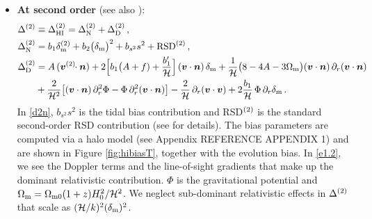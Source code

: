 {\begin{itemize}
\item
{\bfseries At second order}
\cite{Maartens:2019yhx} (see also \cite{Umeh:2015gza,DiDio:2015bua,Umeh:2016thy,Clarkson:2018dwn,DiDio:2018zmk}):
\begin{align}
\Delta^{{(2)}} &\equiv  \Delta^{(2)}_{{\mathrm{HI}}} = \Delta^{{(2)}}_{\mathrm{N}} + \Delta^{{(2)}}_{\mathrm{D}} \,,\\
\Delta^{{(2)}}_{\mathrm{N}}&= b_1\delta_{\mathrm{m}}^{{(2)}}+b_2 \big(\delta_{\mathrm{m}}\big)^2+ b_{s^2}s^2 + {\mathrm{RSD}}^{{(2)}}\,,
\label{d2n} \\
\Delta^{{(2)}}_{\mathrm{D}} &= A\, (\bm{v}^{(2)}\!\!\cdot\bm{n})+2\Big[ b_{1}\big(A+f) + \frac{b_1'}{\mathcal{H}}\Big]\,(\bm{v}\cdot\bm{n})\,\delta_{\mathrm{m}} +\frac{1}{\mathcal{H}}\big( 8-4A-3\Omega_{\mathrm{m}}   \big)(\bm{v}\cdot\bm{n})\,\partial_r(\bm{v}\cdot\bm{n})
\nonumber\\ \label{e1.2}
& +\frac{2}{\mathcal{H}^2}\big[(\bm{v}\cdot\bm{n}) \,\partial_r^2\Phi-\Phi\, \partial_r^2 (\bm{v}\cdot\bm{n}) \big]
 -\frac{2}{\mathcal{H}}\,\partial_r (\bm{v}\cdot\bm{v})+2 \frac{{b_{1}}}{\mathcal{H}}\,\Phi\, \partial_r\delta_{\mathrm{m}} \,.
\end{align}
In \eqref{d2n}, $b_{s^2}s^2$ is the tidal bias contribution and RSD$^{{(2)}}$ is the standard second-order RSD contribution (see \cite{Maartens:2019yhx} for details). The bias parameters are computed via a halo model (see  Appendix REFERENCE APPENDIX 1) and are shown in Figure \ref{fig:hibiasT}, together with the evolution bias.
In \eqref{e1.2}, we see the Doppler terms and the line-of-sight gradients that make up the dominant relativistic contribution.
$\Phi$ is the gravitational potential and $\Omega_{\mathrm{m}} =\Omega_{{\mathrm{m}}0}(1+z)H_0^2/\mathcal{H}^2$. We  neglect sub-dominant relativistic effects in $\Delta^{{(2)}}$ that scale as  $(\mathcal{H}/k)^2(\delta_{\mathrm{m}})^2$. 


\end{itemize}}
